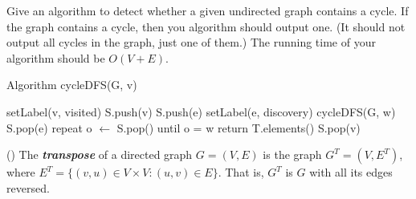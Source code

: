 \documentclass[addpoints,11pt]{exam}
\begin{document}
\begin{questions}
\newpage


\question[10]
Give an algorithm to detect whether a given undirected graph contains a cycle.  If the graph contains a cycle, then you algorithm should output one.  (It should not output all cycles in the graph, just one of them.)  The running time of your algorithm should be $O(V+E)$.
\begin{solutionorbox}
Algorithm cycleDFS(G, v)
\begin{algorithmic}[1]
\STATE setLabel(v, visited)
\STATE S.push(v)
      \STATE S.push(e)
        \STATE setLabel(e, discovery)
        \STATE cycleDFS(G, w)
        \STATE S.pop(e)
      \ELSE
        \STATE repeat
        \STATE o $\leftarrow$ S.pop()
        \STATE until o = w
        \STATE return T.elements()
      \ENDIF\ENDIF\ENDFOR
\STATE S.pop(v)
\end{algorithmic}
\end{solutionorbox}

\newpage


\question (\totalpoints {}) 
The \textbf{\textit{transpose}} of a directed graph $G = (V, E)$ is the graph $G^T = (V, E^T)$, where $E^T = \{(v,u) \in V \times V : (u,v) \in E\}$.  That is, $G^T$ is $G$ with all its edges reversed. 
\end{questions}
\end{document}
